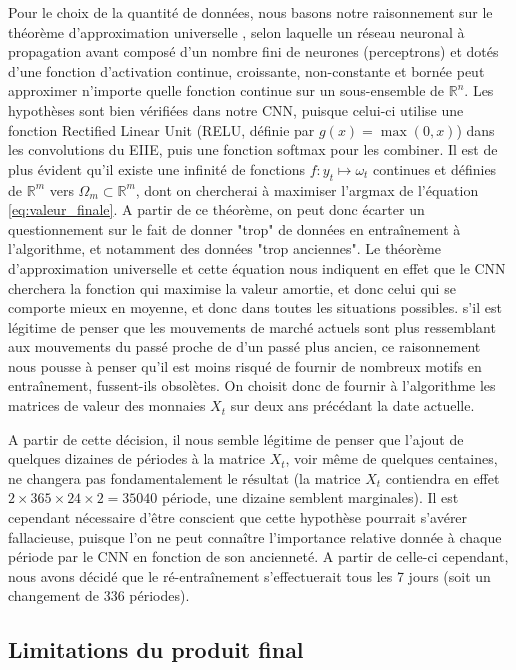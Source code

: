 \documentclass[a4paper, 10pt]{article}
\begin{document}
Pour le choix de la quantité de données, nous basons notre raisonnement sur le théorème d'approximation universelle \cite{Hornik1991}, selon laquelle un réseau neuronal à propagation avant composé d'un nombre fini de neurones (perceptrons) et dotés d'une fonction d'activation continue, croissante, non-constante et bornée peut approximer n'importe quelle fonction continue sur un sous-ensemble de $\mathbb{R}^n$. Les hypothèses sont bien vérifiées dans notre CNN, puisque celui-ci utilise une fonction Rectified Linear Unit (RELU, définie par $g(x) = \max(0, x)$) dans les convolutions du EIIE, puis une fonction softmax pour les combiner. Il est de plus évident qu'il existe une infinité de fonctions $f \colon y_t \mapsto \omega_t$ continues et définies de $\mathbb{R}^m$ vers $\Omega_m \subset \mathbb{R}^m$, dont on chercherai à maximiser l'argmax de l'équation \eqref{eq:valeur_finale}. A partir de ce théorème, on peut donc écarter un questionnement sur le fait de donner "trop" de données en entraînement à l'algorithme, et notamment des données "trop anciennes". Le théorème d'approximation universelle et cette équation nous indiquent en effet que le CNN cherchera la fonction qui maximise la valeur amortie, et donc celui qui se comporte mieux en moyenne, et donc dans toutes les situations possibles. s'il est légitime de penser que les mouvements de marché actuels sont plus ressemblant aux mouvements du passé proche de d'un passé plus ancien, ce raisonnement nous pousse à penser qu'il est moins risqué de fournir de nombreux motifs en entraînement, fussent-ils obsolètes. On choisit donc de fournir à l'algorithme les matrices de valeur des monnaies $X_t$ sur deux ans précédant la date actuelle.

A partir de cette décision, il nous semble légitime de penser que l'ajout de quelques dizaines de périodes à la matrice $X_t$, voir même de quelques centaines, ne changera pas fondamentalement le résultat (la matrice $X_t$ contiendra en effet $2 \times 365 \times 24 \times 2 = 35 040$ période, une dizaine semblent marginales). Il est cependant nécessaire d'être conscient que cette hypothèse pourrait s'avérer fallacieuse, puisque l'on ne peut connaître l'importance relative donnée à chaque période par le CNN en fonction de son ancienneté. A partir de celle-ci cependant, nous avons décidé que le ré-entraînement s'effectuerait tous les 7 jours (soit un changement de $336$ périodes).

\subsection{Limitations du produit final}
\end{document}
